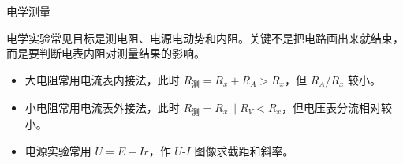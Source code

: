\begin{conceptbox}{电学测量}

电学实验常见目标是测电阻、电源电动势和内阻。关键不是把电路画出来就结束，而是要判断电表内阻对测量结果的影响。

\begin{center}


\label{fig:electric-meter-circuits}
\end{center}

\begin{itemize}
  \item 大电阻常用电流表内接法，此时 $R_{\text{测}}=R_x+R_A>R_x$，但 $R_A/R_x$ 较小。
  \item 小电阻常用电流表外接法，此时 $R_{\text{测}}=R_x\parallel R_V<R_x$，但电压表分流相对较小。
  \item 电源实验常用 $U=E-Ir$，作 $U$-$I$ 图像求截距和斜率。
\end{itemize}
\end{conceptbox}

